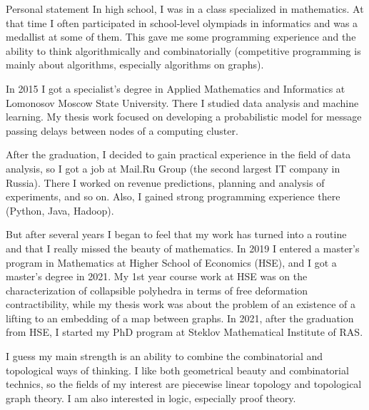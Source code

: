 \documentclass{resume}
\begin{document}
\begin{rSection}{Personal statement}
In high school, I was in a class specialized in mathematics. At that time I often participated in
school-level olympiads in informatics and was a medallist at some of them. This
gave me some programming experience and the ability to think algorithmically and combinatorially
(competitive programming is mainly about algorithms, especially algorithms on graphs).

In 2015 I got a specialist's degree in Applied Mathematics and Informatics at Lomonosov Moscow State
University. There I studied data analysis and machine learning. My thesis work focused on developing
a probabilistic model for message passing delays between nodes of a computing cluster.

After the graduation, I decided to gain practical experience in the field of data analysis, so I got
a job at Mail.Ru Group (the second largest IT company in Russia). There I worked on revenue
predictions, planning and analysis of experiments, and so on. Also, I gained strong programming
experience there (Python, Java, Hadoop).

But after several years I began to feel that my work has turned into a routine and that I really
missed the beauty of mathematics. In 2019 I entered a master's program in Mathematics at
Higher School of Economics (HSE), and I got a master's degree in 2021. My 1st year course work at HSE was on the
characterization of collapsible polyhedra in terms of free deformation contractibility, while my
thesis work was about the problem of an existence of a lifting to an embedding of a map between graphs.
In 2021, after the graduation from HSE, I started my PhD program at Steklov Mathematical Institute of RAS.

I guess my main strength is an ability to combine the combinatorial and topological ways of
thinking. I like both geometrical beauty and combinatorial technics, so the fields of my
interest are piecewise linear topology and topological graph theory. I am also interested in logic, especially proof theory.
\end{rSection}
\end{document}
